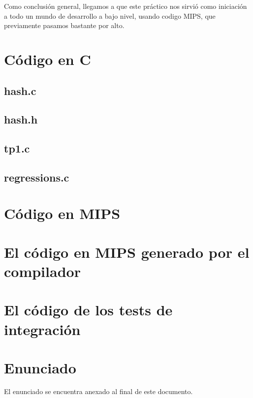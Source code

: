 \documentclass[11pt,a4paper]{article}
\begin{document}
Como conclusión general, llegamos a que este práctico nos sirvió como iniciación a todo un mundo de desarrollo a bajo nivel, usando codigo MIPS, que previamente pasamos bastante por alto.


\section{Código en C}
\subsection{hash.c}

\subsection{hash.h}

\subsection{tp1.c}

\subsection{regressions.c}


\section{Código en MIPS}


\section{El código en MIPS generado por el compilador}



\section{El código de los tests de integración}



\section{Enunciado}
El enunciado se encuentra anexado al final de este documento.
\end{document}
